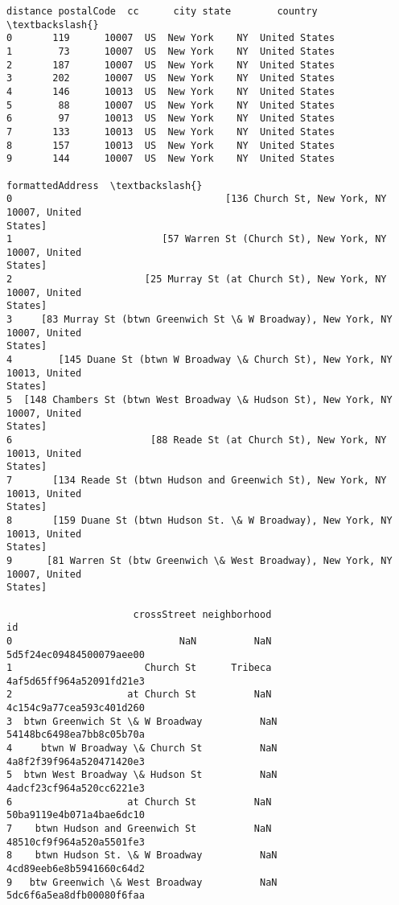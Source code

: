 \documentclass[11pt]{article}
\begin{document}
\begin{tcolorbox}[breakable, size=fbox, boxrule=.5pt, pad at break*=1mm, opacityfill=0]
\begin{Verbatim}[commandchars=\\\{\}]
   distance postalCode  cc      city state        country  \textbackslash{}
0       119      10007  US  New York    NY  United States
1        73      10007  US  New York    NY  United States
2       187      10007  US  New York    NY  United States
3       202      10007  US  New York    NY  United States
4       146      10013  US  New York    NY  United States
5        88      10007  US  New York    NY  United States
6        97      10013  US  New York    NY  United States
7       133      10013  US  New York    NY  United States
8       157      10013  US  New York    NY  United States
9       144      10007  US  New York    NY  United States

formattedAddress  \textbackslash{}
0                                     [136 Church St, New York, NY 10007, United
States]
1                          [57 Warren St (Church St), New York, NY 10007, United
States]
2                       [25 Murray St (at Church St), New York, NY 10007, United
States]
3     [83 Murray St (btwn Greenwich St \& W Broadway), New York, NY 10007, United
States]
4        [145 Duane St (btwn W Broadway \& Church St), New York, NY 10013, United
States]
5  [148 Chambers St (btwn West Broadway \& Hudson St), New York, NY 10007, United
States]
6                        [88 Reade St (at Church St), New York, NY 10013, United
States]
7       [134 Reade St (btwn Hudson and Greenwich St), New York, NY 10013, United
States]
8       [159 Duane St (btwn Hudson St. \& W Broadway), New York, NY 10013, United
States]
9      [81 Warren St (btw Greenwich \& West Broadway), New York, NY 10007, United
States]

                      crossStreet neighborhood                        id
0                             NaN          NaN  5d5f24ec09484500079aee00
1                       Church St      Tribeca  4af5d65ff964a52091fd21e3
2                    at Church St          NaN  4c154c9a77cea593c401d260
3  btwn Greenwich St \& W Broadway          NaN  54148bc6498ea7bb8c05b70a
4     btwn W Broadway \& Church St          NaN  4a8f2f39f964a520471420e3
5  btwn West Broadway \& Hudson St          NaN  4adcf23cf964a520cc6221e3
6                    at Church St          NaN  50ba9119e4b071a4bae6dc10
7    btwn Hudson and Greenwich St          NaN  48510cf9f964a520a5501fe3
8    btwn Hudson St. \& W Broadway          NaN  4cd89eeb6e8b5941660c64d2
9   btw Greenwich \& West Broadway          NaN  5dc6f6a5ea8dfb00080f6faa
\end{Verbatim}
\end{tcolorbox}
        
\end{document}
